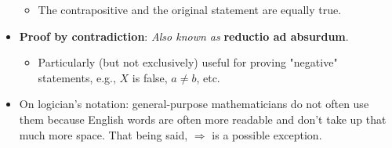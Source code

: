 \documentclass[../main.tex]{subfiles}
\begin{document}
\begin{itemize}
    \begin{itemize}
        \item The contrapositive and the original statement are equally true.
    \end{itemize}
    \item \textbf{Proof by contradiction}:  \emph{Also known as} \textbf{reductio ad absurdum}.
    \begin{itemize}
        \item Particularly (but not exclusively) useful for proving "negative" statements, e.g., $X$ is false, $a\neq b$, etc.
    \end{itemize}
    \item On logician's notation: general-purpose mathematicians do not often use them because English words are often more readable and don't take up that much more space. That being said, $\Longrightarrow$ is a possible exception.
\end{itemize}
\end{document}
